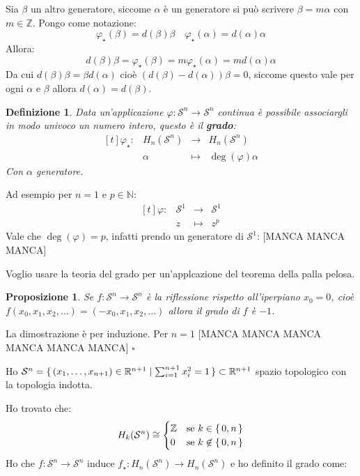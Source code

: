 \documentclass[10pt, twoside=false, x11names]{scrbook}
\newtheorem{proposition}[theorem]{Proposizione}
\newtheorem{definition}[theorem]{Definizione}
\newenvironment{proof}{{\textbf{Dimostrazione}:}}{\hfill $\square$}
\newcommand{\Z}{\mathbb{Z}}
\renewcommand{\phi}{\varphi}
\newcommand{\RN}[1][]{\mathbb{R}^#1}
\newcommand{\Sph}[1][]{\mathcal{S}^#1}
\begin{document}
Sia $ \beta $ un altro generatore, siccome $ \alpha $ è un generatore si può scrivere $ \beta = m \alpha $
con $ m \in \Z $. Pongo come notazione:
\[
  \phi_\star(\beta) = d(\beta) \beta \quad \phi_\star(\alpha) = d(\alpha) \alpha
\]
Allora:
\[
  d(\beta) \beta = \phi_\star (\beta) = m \phi_\star (\alpha) = m d(\alpha) \alpha
\]
Da cui $ d(\beta) \beta = \beta d(\alpha) $ cioè $ \left(d(\beta) - d(\alpha) \right) \beta = 0 $, siccome
questo vale per ogni $ \alpha $ e $ \beta $ allora $ d(\alpha) = d(\beta) $.
\begin{definition}
  Data un'applicazione $ \phi \colon \Sph{n} \to \Sph{n} $ continua è possibile
  associargli in modo univoco un numero intero, questo è il \textbf{grado}:
   \[
    \begin{aligned}[t]
      \phi_\star \colon & H_n(\Sph{n}) & \to & H_n(\Sph{n}) \\
      & \alpha & \mapsto & \deg{(\phi)} \alpha
    \end{aligned}
  \]
  Con $ \alpha $ generatore.
\end{definition}

Ad esempio per $ n = 1 $ e $ p \in \mathbb{N} $:
\[
  \begin{aligned}[t]
    \phi \colon & \Sph{1} & \to & \Sph{1} \\
    & z   & \mapsto & z^p
  \end{aligned}
\]
Vale che $ \deg{(\phi)} = p $, infatti prendo un generatore di $ \Sph{1} $:
[MANCA MANCA MANCA]

Voglio usare la teoria del grado per un'applcazione del teorema della palla pelosa.
\begin{proposition}
  Se $ f \colon \Sph{n} \to \Sph{n} $ è la riflessione rispetto all'iperpiano $ x_0 = 0 $,
  cioè $ f(x_0, x_1, x_2, \dots) = (-x_0, x_1, x_2, \dots) $ allora il grado di $ f $ è $ - 1 $.
\end{proposition}
\begin{proof}
  La dimostrazione è per induzione.
  Per $ n = 1 $
  [MANCA MANCA MANCA MANCA MANCA MANCA]
\end{proof}


Ho $ \Sph{n} = \set{ (x_1, \dots, x_{n+1}) \in \RN{n+1} | \sum_{i=1}^{n+1} x_i^2 = 1 } \subset \RN{n+1} $
spazio topologico con la topologia indotta.

Ho trovato che:
\[
  H_k(\Sph{n}) \cong
  \begin{cases}
    \Z & \text{se } k \in \set{0, n} \\
    0 & \text{se } k \not \in \set{0, n}
  \end{cases}
\]
Ho che $ f \colon \Sph{n} \to \Sph{n} $ induce $ f_\star \colon H_n(\Sph{n}) \to H_n(\Sph{n}) $ e ho definito il grado
come:
\end{document}
